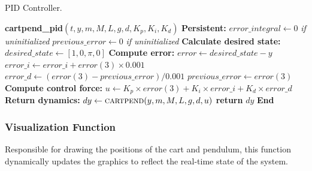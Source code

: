 \documentclass[journal,twoside,web]{ieeecolor}
\begin{document}
\begin{algorithm}[H]
\caption{PID Controller.}\label{alg:cartpend_pid}
\begin{algorithmic}
\STATE \textbf{cartpend\_pid}$(t, y, m, M, L, g, d, K_p, K_i, K_d)$
\STATE \hspace{0.5cm} \textbf{Persistent:}
\STATE \hspace{1cm} $error\_integral \gets 0$ \textit{if uninitialized}
\STATE \hspace{1cm} $previous\_error \gets 0$ \textit{if uninitialized}
\STATE \hspace{0.5cm} \textbf{Calculate desired state:}
\STATE \hspace{1cm} $desired\_state \gets [1, 0, \pi, 0]$
\STATE \hspace{0.5cm} \textbf{Compute error:}
\STATE \hspace{1cm} $error \gets desired\_state - y$
\STATE \hspace{1cm} $error\_i \gets error\_i + error(3) \times 0.001$
\STATE \hspace{1cm} $error\_d \gets (error(3) - previous\_error) / 0.001$
\STATE \hspace{1cm} $previous\_error \gets error(3)$
\STATE \hspace{0.5cm} \textbf{Compute control force:}
\STATE \hspace{1cm} $u \gets K_p \times error(3) + K_i \times error\_i + K_d \times error\_d$
\STATE \hspace{0.5cm} \textbf{Return dynamics:}
\STATE \hspace{1cm} $dy \gets \textsc{cartpend}(y, m, M, L, g, d, u)$
\STATE \hspace{1cm} \textbf{return} $dy$
\STATE \textbf{End}
\end{algorithmic}
\end{algorithm}





\subsubsection{Visualization Function}
Responsible for drawing the positions of the cart and pendulum, this function dynamically updates the graphics to reflect the real-time state of the system.
\end{document}
